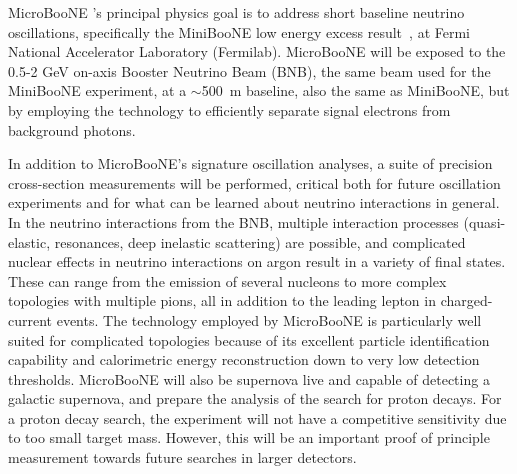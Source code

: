    
MicroBooNE 's principal physics goal is to address short baseline neutrino oscillations, specifically the MiniBooNE low energy excess result~\cite{AguilarArevalo:2008rc}, at Fermi National Accelerator Laboratory (Fermilab).  MicroBooNE will be exposed to the  0.5-2 GeV on-axis Booster Neutrino Beam (BNB), the same beam used for the MiniBooNE experiment, at a $\sim$500~m baseline, also the same as MiniBooNE, but by employing the \lartpc technology to efficiently separate signal electrons from background photons.  

In addition to MicroBooNE's signature oscillation analyses, a suite of precision cross-section measurements will be performed, critical both for future \lartpc oscillation experiments and for what can be learned about neutrino interactions in general.   In the neutrino interactions from the BNB, multiple interaction processes (quasi-elastic, resonances, deep inelastic scattering) are possible, and complicated nuclear effects in neutrino interactions on argon result in a variety of final states. These can range from the emission of several nucleons to more complex topologies with multiple pions, all in addition to the leading lepton in charged-current events. The \lartpc technology employed by MicroBooNE is particularly well suited for complicated topologies because of its excellent particle identification capability and calorimetric energy reconstruction down to very low detection thresholds. MicroBooNE will also be supernova live and capable of detecting a galactic supernova, and prepare the analysis of  the search for proton decays. For a proton decay search, the experiment will not have a competitive sensitivity due to too small target mass. However, this will be an important proof of principle measurement towards future searches in larger detectors.  

